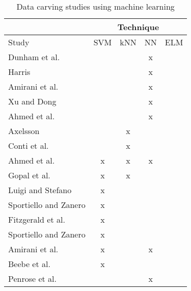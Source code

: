 \begin{table}[!ht]
\caption{Data carving studies using machine learning}
\label{tab:datacarvingstudies}
\begin{tabular}{l|c|c|c|c}

                                & \multicolumn{4}{c}{Technique} \\ \hline
Study                                     & SVM    & kNN    & NN   & ELM   \\ \hline
\hline
Dunham et al. \cite{dunham_classifying_2005}       &        &        & x    &       \\ \hline
Harris \cite{harris_using_2007}             &        &        & x    &       \\ \hline
Amirani et al. \cite{amirani_new_2008}              &        &        & x    &       \\ \hline
Xu and Dong \cite{xu_reassembling_2009}          &        &        & x    &       \\ \hline
Ahmed et al. \cite{ahmed_content-based_2010}      &        &        & x    &       \\ \hline
Axelsson \cite{axelsson_normalised_2010}      &        & x      &      &       \\ \hline
Conti et al. \cite{conti_automated_2010}          &        & x      &      &       \\ \hline
Ahmed et al. \cite{ahmed_fast_2011}               & x      & x      & x    &       \\ \hline
Gopal et al. \cite{gopal_statistical_2011}        & x      & x      &      &       \\ \hline
Luigi and Stefano \cite{luigi_file_2011}               & x      &        &      &       \\ \hline
Sportiello and Zanero \cite{sportiello_file_2011}          & x      &        &      &       \\ \hline
Fitzgerald et al. \cite{fitzgerald_using_2012}         & x      &        &      &       \\ \hline
Sportiello and Zanero \cite{sportiello_context-based_2012} & x      &        &      &       \\ \hline
Amirani et al. \cite{amirani_feature-based_2013}    & x      &        & x    &       \\ \hline
Beebe et al. \cite{beebe_sceadan:_2013}           & x      &        &      &       \\ \hline
Penrose et al. \cite{penrose_approaches_2013}       &        &        & x    &       \\ \hline

\end{tabular}
\end{table}
